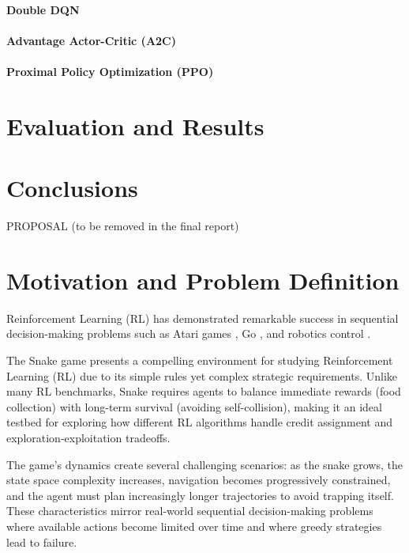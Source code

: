 \documentclass[10pt,twocolumn,letterpaper]{article}
\begin{document}
\paragraph{Double DQN}
\paragraph{Advantage Actor-Critic (A2C)}
\paragraph{Proximal Policy Optimization (PPO)}

\section{Evaluation and Results}

\section{Conclusions}


{\footnotesize


}

\clearpage 
{\LARGE PROPOSAL (to be removed in the final report)}

\section{Motivation and Problem Definition}

Reinforcement Learning (RL) has demonstrated remarkable success in sequential decision-making problems such as Atari games \cite{mnih2015human}, Go \cite{silver2016mastering}, and robotics control \cite{singh2022reinforcement}. 

The Snake game presents a compelling environment for studying Reinforcement Learning (RL) due to its simple rules yet complex strategic requirements. Unlike many RL benchmarks, Snake requires agents to balance immediate rewards (food collection) with long-term survival (avoiding self-collision), making it an ideal testbed for exploring how different RL algorithms handle credit assignment and exploration-exploitation tradeoffs.

The game's dynamics create several challenging scenarios: as the snake grows, the state space complexity increases, navigation becomes progressively constrained, and the agent must plan increasingly longer trajectories to avoid trapping itself. These characteristics mirror real-world sequential decision-making problems where available actions become limited over time and where greedy strategies lead to failure.
\end{document}
